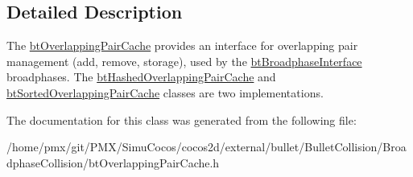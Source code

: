 \subsection{Detailed Description}
The \hyperlink{classbtOverlappingPairCache}{bt\+Overlapping\+Pair\+Cache} provides an interface for overlapping pair management (add, remove, storage), used by the \hyperlink{classbtBroadphaseInterface}{bt\+Broadphase\+Interface} broadphases. The \hyperlink{classbtHashedOverlappingPairCache}{bt\+Hashed\+Overlapping\+Pair\+Cache} and \hyperlink{classbtSortedOverlappingPairCache}{bt\+Sorted\+Overlapping\+Pair\+Cache} classes are two implementations. 

The documentation for this class was generated from the following file\+:\begin{DoxyCompactItemize}
\item 
/home/pmx/git/\+P\+M\+X/\+Simu\+Cocos/cocos2d/external/bullet/\+Bullet\+Collision/\+Broadphase\+Collision/bt\+Overlapping\+Pair\+Cache.\+h\end{DoxyCompactItemize}
